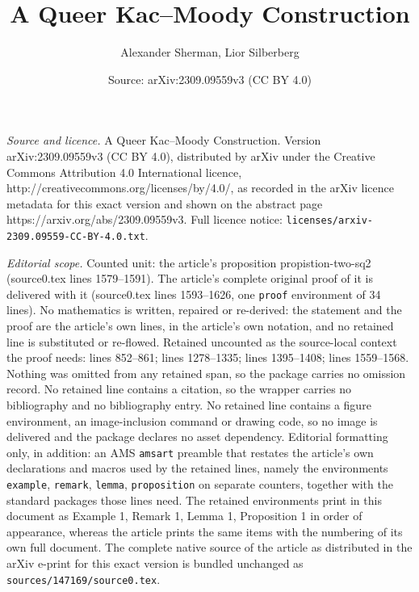 \documentclass[10pt,a4paper]{amsart}
\title{A Queer Kac--Moody Construction}
\author{Alexander Sherman, Lior Silberberg}
\date{Source: arXiv:2309.09559v3 (CC BY 4.0)}
\begin{document}
\maketitle

\noindent\emph{Source and licence.} A Queer Kac--Moody Construction. Version arXiv:2309.09559v3 (CC BY 4.0), distributed by arXiv under the Creative Commons Attribution 4.0 International licence, http://creativecommons.org/licenses/by/4.0/, as recorded in the arXiv licence metadata for this exact version and shown on the abstract page https://arxiv.org/abs/2309.09559v3. Full licence notice: \texttt{licenses/arxiv-2309.09559-CC-BY-4.0.txt}.\par\smallskip

\noindent\textit{Editorial scope.} Counted unit: the article's proposition propistion-two-sq2 (source0.tex lines 1579--1591). The article's complete original proof of it is delivered with it (source0.tex lines 1593--1626, one \texttt{proof} environment of 34 lines). No mathematics is written, repaired or re-derived: the statement and the proof are the article's own lines, in the article's own notation, and no retained line is substituted or re-flowed.  Retained uncounted as the source-local context the proof needs: lines 852--861; lines 1278--1335; lines 1395--1408; lines 1559--1568.  Nothing was omitted from any retained span, so the package carries no omission record.  No retained line contains a citation, so the wrapper carries no bibliography and no bibliography entry.  No retained line contains a figure environment, an image-inclusion command or drawing code, so no image is delivered and the package declares no asset dependency.  Editorial formatting only, in addition: an AMS \texttt{amsart} preamble that restates the article's own declarations and macros used by the retained lines, namely the environments \texttt{example}, \texttt{remark}, \texttt{lemma}, \texttt{proposition} on separate counters, together with the standard packages those lines need.  The retained environments print in this document as Example 1, Remark 1, Lemma 1, Proposition 1 in order of appearance, whereas the article prints the same items with the numbering of its own full document.  The complete native source of the article as distributed in the arXiv e-print for this exact version is bundled unchanged as \texttt{sources/147169/source0.tex}.
\end{document}
